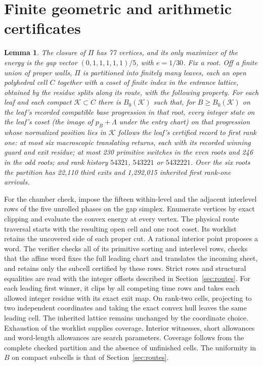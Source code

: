 \documentclass[11pt,reqno]{amsart}
\newtheorem{lemma}[theorem]{Lemma}
\theoremstyle{definition}
\begin{document}
\appendix
\section{Finite geometric and arithmetic certificates}\label{ap:certificates}

\begin{lemma}\label{lem:ingress}
The closure of \(\Pi\) has 77 vertices, and its only maximizer of the
energy is the gap vector \((0,1,1,1,1,1)/5\), with \(e=1/30\). Fix a root. Off a finite
union of proper walls, \(\Pi\) is partitioned into finitely many leaves,
each an open polyhedral cell \(C\) together with a coset of finite index
in the entrance lattice, obtained by the residue splits along its route,
with the following property. For each leaf and each compact
\(\mathcal K\subset C\) there is \(B_0(\mathcal K)\) such that, for
\(B\ge B_0(\mathcal K)\) on the leaf's recorded compatible base progression
in that root, every integer state on the leaf's coset (the image of
\(p_B+\Lambda\) under the entry chart) on that progression whose normalized position lies in \(\mathcal K\) follows the leaf's
certified record to first rank one: at most six macroscopic translating
returns, each with its recorded winning guard and exit residue; at most
230 primitive switches in the even roots and 246 in the odd roots; and
rank history \(54321\), \(543221\) or \(5432221\). Over the six roots the
partition has 22,110 third exits and 1,292,015 inherited first rank-one
arrivals.
\end{lemma}

For the chamber check, impose the fifteen within-level and the
adjacent interlevel rows of the five unrolled phases on the gap
simplex. Enumerate vertices by exact clipping and evaluate the convex
energy at every vertex. The physical route traversal starts with
the resulting open cell and one root coset. Its worklist retains
the uncovered side of each proper cut. A rational interior point
proposes a word. The verifier checks all of its primitive sorting
and interlevel rows, checks that the affine word fixes the full
leading chart and translates the incoming sheet, and retains only
the subcell certified by these rows. Strict rows and structural
equalities are read with the integer offsets described in
Section~\ref{sec:routes}. For each leading first winner, it clips by
all competing time rows and takes each allowed integer residue
with its exact exit map. On rank-two cells, projecting to two
independent coordinates and taking the exact convex hull leaves
the same leading cell. The inherited lattice remains unchanged
by the coordinate choice. Exhaustion of the worklist supplies
coverage. Interior witnesses, short allowances and word-length
allowances are search parameters. Coverage follows from the
complete checked partition and the absence of unfinished cells.
The uniformity in \(B\) on compact subcells is that of
Section~\ref{sec:routes}.
\end{document}
